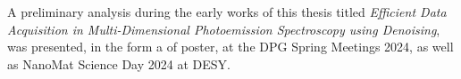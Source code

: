 A preliminary analysis during the early works of this thesis titled
\textit{Efficient Data Acquisition in Multi-Dimensional Photoemission Spectroscopy using Denoising}, was presented, in the form a of poster, at the DPG Spring Meetings 2024, as well as NanoMat Science Day 2024 at DESY. 

